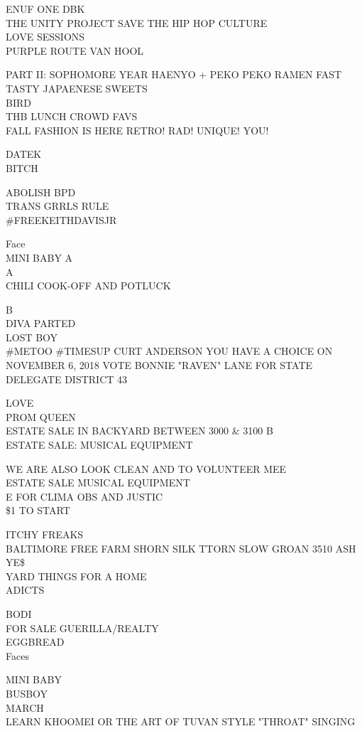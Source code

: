 \documentclass[10pt,letterpaper]{article}
\begin{document}
ENUF ONE DBK\\
THE UNITY PROJECT SAVE THE HIP HOP CULTURE\\
LOVE SESSIONS\\
PURPLE ROUTE VAN HOOL

PART II: SOPHOMORE YEAR HAENYO + PEKO PEKO RAMEN FAST TASTY JAPAENESE SWEETS\\
BIRD\\
THB LUNCH CROWD FAVS\\
FALL FASHION IS HERE RETRO! RAD! UNIQUE! YOU!

DATEK\\
BITCH

ABOLISH BPD\\
TRANS GRRLS RULE\\
\#FREEKEITHDAVISJR

Face\\
MINI BABY A\\
A\\
CHILI COOK{-}OFF AND POTLUCK

B\\
DIVA PARTED\\
LOST BOY\\
\#METOO \#TIMESUP CURT ANDERSON YOU HAVE A CHOICE ON NOVEMBER 6, 2018 VOTE BONNIE "RAVEN" LANE FOR STATE DELEGATE DISTRICT 43

LOVE\\
PROM QUEEN\\
ESTATE SALE IN BACKYARD BETWEEN 3000 \& 3100 B\\
ESTATE SALE: MUSICAL EQUIPMENT

WE ARE ALSO LOOK CLEAN AND TO VOLUNTEER MEE\\
ESTATE SALE MUSICAL EQUIPMENT\\
E FOR CLIMA OBS AND JUSTIC\\
\$1 TO START

ITCHY FREAKS\\
BALTIMORE FREE FARM SHORN SILK TTORN SLOW GROAN 3510 ASH YE\$\\
YARD THINGS FOR A HOME\\
ADICTS

BODI\\
FOR SALE GUERILLA/REALTY\\
EGGBREAD\\
Faces

MINI BABY\\
BUSBOY\\
MARCH\\
LEARN KHOOMEI OR THE ART OF TUVAN STYLE "THROAT" SINGING
\end{document}
